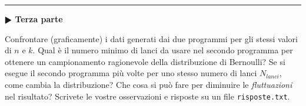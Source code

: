 \documentclass[11pt]{article}
\begin{document}
\hrule
\vspace{2mm}
\textbf{$\RHD$ Terza parte}
\vspace{2mm}

Confrontare (graficamente) i dati generati dai due programmi per gli stessi valori di $n$ e $k$.
Qual \`e il numero minimo di lanci da usare nel secondo programma per ottenere un campionamento ragionevole
della distribuzione di Bernoulli? Se si esegue il secondo programma pi\`u volte per uno stesso numero di lanci
$N_{lanci}$, come cambia la distribuzione? Che cosa si pu\`o fare per diminuire le {\em fluttuazioni\/} nel risultato?
Scrivete le vostre osservazioni e risposte su un file \texttt{risposte.txt}.
\end{document}
